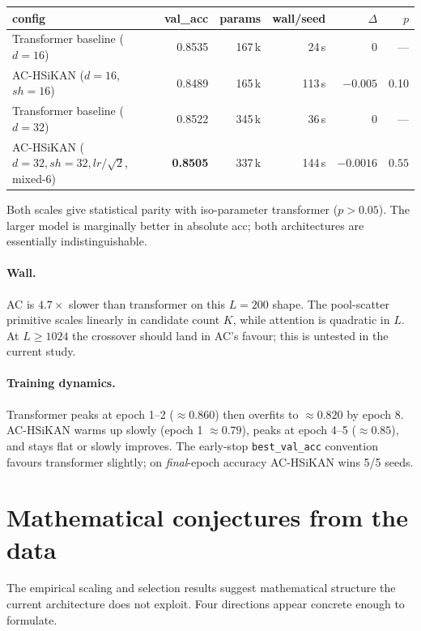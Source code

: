 \documentclass[10pt,a4paper]{article}
\begin{document}
\begin{center}
\begin{tabular}{lrrrrr}
\toprule
config &  val\_acc & params & wall/seed & $\Delta$ & $p$ \\
\midrule
Transformer baseline ($d=16$)               & 0.8535 & 167\,k &  24\,s & 0       & --- \\
AC-HSiKAN ($d=16$, $sh=16$)                  & 0.8489 & 165\,k & 113\,s & $-0.005$ & 0.10 \\
Transformer baseline ($d=32$)               & 0.8522 & 345\,k &  36\,s & 0       & --- \\
AC-HSiKAN ($d=32, sh=32, lr/\!\sqrt{2}$, mixed-6) & \textbf{0.8505} & 337\,k & 144\,s & $\mathbf{-0.0016}$ & $\mathbf{0.55}$ \\
\bottomrule
\end{tabular}
\end{center}

Both scales give statistical parity with iso-parameter transformer
($p > 0.05$). The larger model is marginally better in absolute
acc; both architectures are essentially indistinguishable.

\paragraph{Wall.} AC is $4.7\times$ slower than transformer on this
$L = 200$ shape. The pool-scatter primitive scales linearly in
candidate count $K$, while attention is quadratic in $L$. At
$L \geq 1024$ the crossover should land in AC's favour; this is
untested in the current study.

\paragraph{Training dynamics.} Transformer peaks at epoch 1--2
($\approx 0.860$) then overfits to $\approx 0.820$ by epoch 8.
AC-HSiKAN warms up slowly (epoch 1 $\approx 0.79$), peaks at epoch 4--5
($\approx 0.85$), and stays flat or slowly improves. The early-stop
\texttt{best\_val\_acc} convention favours transformer slightly; on
\emph{final}-epoch accuracy AC-HSiKAN wins 5/5 seeds.

\section{Mathematical conjectures from the data}

The empirical scaling and selection results suggest mathematical
structure the current architecture does not exploit. Four directions
appear concrete enough to formulate.
\end{document}
